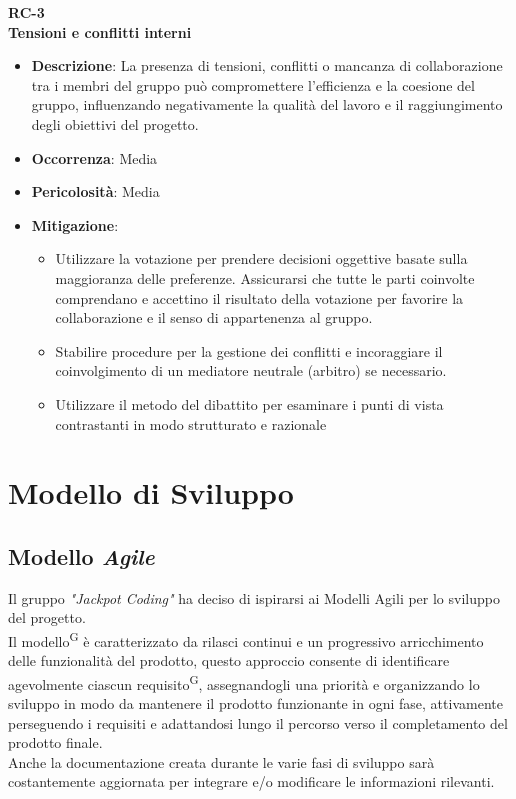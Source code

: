 \documentclass[5pt]{article}
\begin{document}
      \textbf{RC-3}\\
      \textbf{Tensioni e conflitti interni}
      \begin{itemize}
        \item \textbf{Descrizione}: La presenza di tensioni, conflitti o mancanza di collaborazione tra i membri del gruppo può compromettere l'efficienza e la coesione del gruppo, influenzando negativamente la qualità del lavoro e il raggiungimento degli obiettivi del progetto.
        \item \textbf{Occorrenza}: Media
        \item \textbf{Pericolosità}: Media
        \item \textbf{Mitigazione}: 
          \begin{itemize}
            \item Utilizzare la votazione per prendere decisioni oggettive basate sulla maggioranza delle preferenze. Assicurarsi che tutte le parti coinvolte comprendano e accettino il risultato della votazione per favorire la collaborazione e il senso di appartenenza al gruppo.
            \item Stabilire procedure per la gestione dei conflitti e incoraggiare il coinvolgimento di un mediatore neutrale (arbitro) se necessario.
            \item Utilizzare il metodo del dibattito per esaminare i punti di vista contrastanti in modo strutturato e razionale
          \end{itemize}
      \end{itemize}

\section{Modello di Sviluppo}
  \subsection{Modello \textit{Agile}}
    Il gruppo \textit{"Jackpot Coding"} ha deciso di ispirarsi ai Modelli Agili per lo sviluppo del progetto.\\
    Il modello\textsuperscript{G} è caratterizzato da rilasci continui e un progressivo arricchimento delle funzionalità del prodotto, questo approccio consente di identificare agevolmente ciascun requisito\textsuperscript{G}, assegnandogli una priorità e organizzando lo sviluppo in modo da mantenere il prodotto funzionante in ogni fase, attivamente perseguendo i requisiti e adattandosi lungo il percorso verso il completamento del prodotto finale.\\
    Anche la documentazione creata durante le varie fasi di sviluppo sarà costantemente aggiornata per integrare e/o modificare le informazioni rilevanti.
\end{document}
